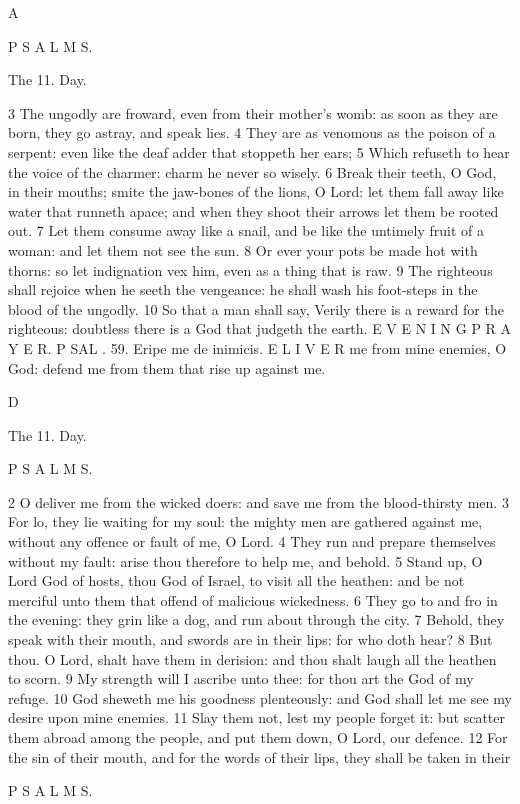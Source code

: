 A

P S A L M S.

The 11. Day.

3 The ungodly are froward, even from their mother’s womb: as soon as they are born, they go astray, and speak lies. 4 They are as venomous as the poison of a serpent: even like the deaf adder that stoppeth her ears; 5 Which refuseth to hear the voice of the charmer: charm he never so wisely. 6 Break their teeth, O God, in their mouths; smite the jaw-bones of the lions, O Lord: let them fall away like water that runneth apace; and when they shoot their arrows let them be rooted out. 7 Let them consume away like a snail, and be like the untimely fruit of a woman: and let them not see the sun. 8 Or ever your pots be made hot with thorns: so let indignation vex him, even as a thing that is raw. 9 The righteous shall rejoice when he seeth the vengeance: he shall wash his foot-steps in the blood of the ungodly. 10 So that a man shall say, Verily there is a reward for the righteous: doubtless there is a God that judgeth the earth. E V E N I N G P R A Y E R. P SAL . 59. Eripe me de inimicis. E L I V E R me from mine enemies, O God: defend me from them that rise up against me.

D

The 11. Day.

P S A L M S.

2 O deliver me from the wicked doers: and save me from the blood-thirsty men. 3 For lo, they lie waiting for my soul: the mighty men are gathered against me, without any offence or fault of me, O Lord. 4 They run and prepare themselves without my fault: arise thou therefore to help me, and behold. 5 Stand up, O Lord God of hosts, thou God of Israel, to visit all the heathen: and be not merciful unto them that offend of malicious wickedness. 6 They go to and fro in the evening: they grin like a dog, and run about through the city. 7 Behold, they speak with their mouth, and swords are in their lips: for who doth hear? 8 But thou. O Lord, shalt have them in derision: and thou shalt laugh all the heathen to scorn. 9 My strength will I ascribe unto thee: for thou art the God of my refuge. 10 God sheweth me his goodness plenteously: and God shall let me see my desire upon mine enemies. 11 Slay them not, lest my people forget it: but scatter them abroad among the people, and put them down, O Lord, our defence. 12 For the sin of their mouth, and for the words of their lips, they shall be taken in their

P S A L M S.


